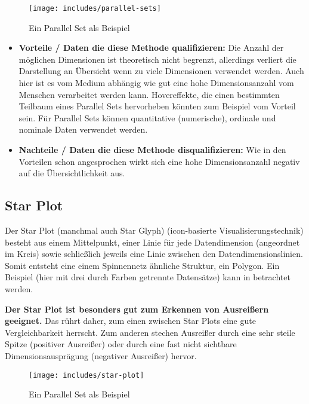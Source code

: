 \documentclass[a4paper,12pt,ngerman]{scrartcl}
\begin{document}
\begin{figure}[ht]
    \centering
    \texttt{[image: includes/parallel-sets]}
    \caption{Ein Parallel Set als Beispiel}
    \label{fig:parallel-sets}
\end{figure}

\begin{itemize}
	\item \textbf{Vorteile / Daten die diese Methode qualifizieren:}
	Die Anzahl der möglichen Dimensionen ist theoretisch nicht begrenzt, allerdings verliert die Darstellung an Übersicht wenn zu viele Dimensionen verwendet werden. Auch hier ist es vom Medium abhängig wie gut eine hohe Dimensionsanzahl vom Menschen verarbeitet werden kann. Hovereffekte, die einen bestimmten Teilbaum eines Parallel Sets hervorheben könnten zum Beispiel vom Vorteil sein. Für Parallel Sets können quantitative (numerische), ordinale und nominale Daten verwendet werden.

	\item \textbf{Nachteile / Daten die diese Methode disqualifizieren:}
	Wie in den Vorteilen schon angesprochen wirkt sich eine hohe Dimensionsanzahl negativ auf die Übersichtlichkeit aus.

\end{itemize}

\subsection*{Star Plot}
Der Star Plot (manchmal auch Star Glyph) (icon-basierte Visualisierungstechnik) besteht aus einem Mittelpunkt, einer Linie für jede Datendimension (angeordnet im Kreis) sowie schließlich jeweils eine Linie zwischen den Datendimensionslinien. Somit entsteht eine einem Spinnennetz ähnliche Struktur, ein Polygon. Ein Beispiel (hier mit drei durch Farben getrennte Datensätze) kann in  betrachtet werden.


\textbf{Der Star Plot ist besonders gut zum Erkennen von Ausreißern geeignet.} Das rührt daher, zum einen zwischen Star Plots eine gute Vergleichbarkeit herrscht. Zum anderen stechen Ausreißer durch eine sehr steile Spitze (positiver Ausreißer) oder durch eine fast nicht sichtbare Dimensionsausprägung (negativer Ausreißer) hervor.

\begin{figure}[ht]
    \centering
    \texttt{[image: includes/star-plot]}
    \caption{Ein Parallel Set als Beispiel}
    \label{fig:star-plot}
\end{figure}
\end{document}
